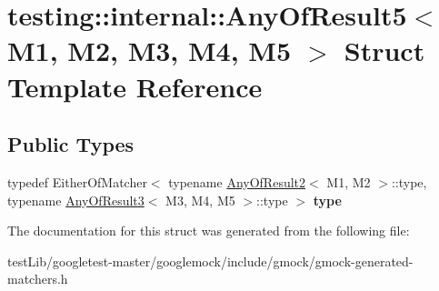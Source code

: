 \hypertarget{structtesting_1_1internal_1_1AnyOfResult5}{}\section{testing\+:\+:internal\+:\+:Any\+Of\+Result5$<$ M1, M2, M3, M4, M5 $>$ Struct Template Reference}
\label{structtesting_1_1internal_1_1AnyOfResult5}
\subsection*{Public Types}
\begin{DoxyCompactItemize}
\item 
\mbox{\label{structtesting_1_1internal_1_1AnyOfResult5_a459a06dc5791313dce942668714f0c99}} 
typedef Either\+Of\+Matcher$<$ typename \hyperlink{structtesting_1_1internal_1_1AnyOfResult2}{Any\+Of\+Result2}$<$ M1, M2 $>$\+::type, typename \hyperlink{structtesting_1_1internal_1_1AnyOfResult3}{Any\+Of\+Result3}$<$ M3, M4, M5 $>$\+::type $>$ {\bfseries type}
\end{DoxyCompactItemize}


The documentation for this struct was generated from the following file\+:\begin{DoxyCompactItemize}
\item 
test\+Lib/googletest-\/master/googlemock/include/gmock/gmock-\/generated-\/matchers.\+h\end{DoxyCompactItemize}
